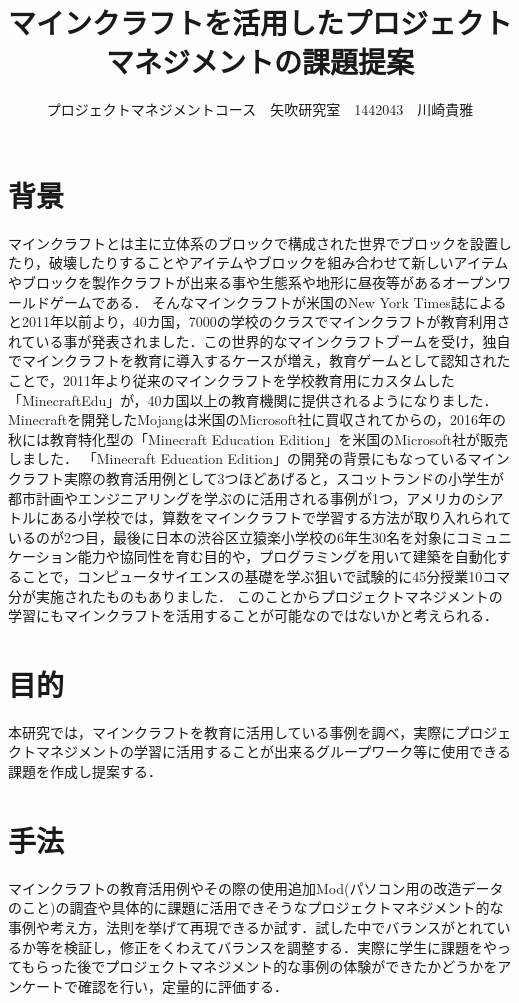 \documentclass[uplatex,twocolumn,dvipdfmx]{jsarticle}
\title{\vspace{-5mm}\fontsize{14pt}{0pt}\selectfont マインクラフトを活用したプロジェクトマネジメントの課題提案}
\author{\normalsize プロジェクトマネジメントコース　矢吹研究室　1442043　川崎貴雅}
\date{}
\begin{document}
\fontsize{10.5pt}{\baselineskip}\selectfont
\maketitle





\section{背景}

マインクラフトとは主に立体系のブロックで構成された世界でブロックを設置したり，破壊したりすることやアイテムやブロックを組み合わせて新しいアイテムやブロックを製作クラフトが出来る事や生態系や地形に昼夜等があるオープンワールドゲームである．
そんなマインクラフトが米国のNew York Times誌によると2011年以前より，40カ国，7000の学校のクラスでマインクラフトが教育利用されている事が発表されました．この世界的なマインクラフトブームを受け，独自でマインクラフトを教育に導入するケースが増え，教育ゲームとして認知されたことで，2011年より従来のマインクラフトを学校教育用にカスタムした「MinecraftEdu」が，40カ国以上の教育機関に提供されるようになりました．\cite{self}
Minecraftを開発したMojangは米国のMicrosoft社に買収されてからの，2016年の秋には教育特化型の「Minecraft Education Edition」を米国のMicrosoft社が販売しました．
「Minecraft Education Edition」の開発の背景にもなっているマインクラフト実際の教育活用例として3つほどあげると，スコットランドの小学生が都市計画やエンジニアリングを学ぶのに活用される事例が1つ\cite{self2}，アメリカのシアトルにある小学校では，算数をマインクラフトで学習する方法が取り入れられているのが2つ目，最後に日本の渋谷区立猿楽小学校の6年生30名を対象にコミュニケーション能力や協同性を育む目的や，プログラミングを用いて建築を自動化することで，コンピュータサイエンスの基礎を学ぶ狙いで試験的に45分授業10コマ分が実施されたものもありました．
このことからプロジェクトマネジメントの学習にもマインクラフトを活用することが可能なのではないかと考えられる．




\section{目的}
本研究では，マインクラフトを教育に活用している事例を調べ，実際にプロジェクトマネジメントの学習に活用することが出来るグループワーク等に使用できる課題を作成し提案する．

\section{手法}
マインクラフトの教育活用例やその際の使用追加Mod(パソコン用の改造データのこと)の調査や具体的に課題に活用できそうなプロジェクトマネジメント的な事例や考え方，法則を挙げて再現できるか試す．試した中でバランスがとれているか等を検証し，修正をくわえてバランスを調整する．実際に学生に課題をやってもらった後でプロジェクトマネジメント的な事例の体験ができたかどうかをアンケートで確認を行い，定量的に評価する．
\end{document}
